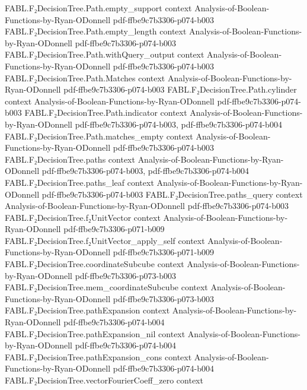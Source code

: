 \begin{theorem}
\proofstep
  {FABL.F₂DecisionTree.Path.empty_support}
  {context}
  {Analysis-of-Boolean-Functions-by-Ryan-ODonnell}
  {pdf-ffbe9c7b3306-p074-b003}
\proofstep
  {FABL.F₂DecisionTree.Path.empty_length}
  {context}
  {Analysis-of-Boolean-Functions-by-Ryan-ODonnell}
  {pdf-ffbe9c7b3306-p074-b003}
\proofstep
  {FABL.F₂DecisionTree.Path.withQuery_output}
  {context}
  {Analysis-of-Boolean-Functions-by-Ryan-ODonnell}
  {pdf-ffbe9c7b3306-p074-b003}
\proofstep
  {FABL.F₂DecisionTree.Path.Matches}
  {context}
  {Analysis-of-Boolean-Functions-by-Ryan-ODonnell}
  {pdf-ffbe9c7b3306-p074-b003}
\proofstep
  {FABL.F₂DecisionTree.Path.cylinder}
  {context}
  {Analysis-of-Boolean-Functions-by-Ryan-ODonnell}
  {pdf-ffbe9c7b3306-p074-b003}
\proofstep
  {FABL.F₂DecisionTree.Path.indicator}
  {context}
  {Analysis-of-Boolean-Functions-by-Ryan-ODonnell}
  {pdf-ffbe9c7b3306-p074-b003,
    pdf-ffbe9c7b3306-p074-b004}
\proofstep
  {FABL.F₂DecisionTree.Path.matches_empty}
  {context}
  {Analysis-of-Boolean-Functions-by-Ryan-ODonnell}
  {pdf-ffbe9c7b3306-p074-b003}
\proofstep
  {FABL.F₂DecisionTree.paths}
  {context}
  {Analysis-of-Boolean-Functions-by-Ryan-ODonnell}
  {pdf-ffbe9c7b3306-p074-b003,
    pdf-ffbe9c7b3306-p074-b004}
\proofstep
  {FABL.F₂DecisionTree.paths_leaf}
  {context}
  {Analysis-of-Boolean-Functions-by-Ryan-ODonnell}
  {pdf-ffbe9c7b3306-p074-b003}
\proofstep
  {FABL.F₂DecisionTree.paths_query}
  {context}
  {Analysis-of-Boolean-Functions-by-Ryan-ODonnell}
  {pdf-ffbe9c7b3306-p074-b003}
\proofstep
  {FABL.F₂DecisionTree.f₂UnitVector}
  {context}
  {Analysis-of-Boolean-Functions-by-Ryan-ODonnell}
  {pdf-ffbe9c7b3306-p071-b009}
\proofstep
  {FABL.F₂DecisionTree.f₂UnitVector_apply_self}
  {context}
  {Analysis-of-Boolean-Functions-by-Ryan-ODonnell}
  {pdf-ffbe9c7b3306-p071-b009}
\proofstep
  {FABL.F₂DecisionTree.coordinateSubcube}
  {context}
  {Analysis-of-Boolean-Functions-by-Ryan-ODonnell}
  {pdf-ffbe9c7b3306-p073-b003}
\proofstep
  {FABL.F₂DecisionTree.mem_coordinateSubcube}
  {context}
  {Analysis-of-Boolean-Functions-by-Ryan-ODonnell}
  {pdf-ffbe9c7b3306-p073-b003}
\proofstep
  {FABL.F₂DecisionTree.pathExpansion}
  {context}
  {Analysis-of-Boolean-Functions-by-Ryan-ODonnell}
  {pdf-ffbe9c7b3306-p074-b004}
\proofstep
  {FABL.F₂DecisionTree.pathExpansion_nil}
  {context}
  {Analysis-of-Boolean-Functions-by-Ryan-ODonnell}
  {pdf-ffbe9c7b3306-p074-b004}
\proofstep
  {FABL.F₂DecisionTree.pathExpansion_cons}
  {context}
  {Analysis-of-Boolean-Functions-by-Ryan-ODonnell}
  {pdf-ffbe9c7b3306-p074-b004}
\proofstep
  {FABL.F₂DecisionTree.vectorFourierCoeff_zero}
  {context}

\end{theorem}

